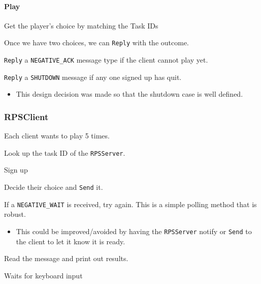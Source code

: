 \documentclass[letterpaper]{article}
\begin{document}
\paragraph{Play%
  \label{play}%
}
\setcounter{listcnt0}{0}
\begin{list}{.}
{
\setlength{\rightmargin}{\leftmargin}
}

\item Get the player's choice by matching the Task IDs

\item Once we have two choices, we can \texttt{Reply} with the outcome.

\item \texttt{Reply} a \texttt{NEGATIVE\_ACK} message type if the client cannot play yet.

\item \texttt{Reply} a \texttt{SHUTDOWN} message if any one signed up has quit.
%
\begin{itemize}

\item This design decision was made so that the shutdown case is well defined.

\end{itemize}
\end{list}


\subsubsection{RPSClient%
  \label{rpsclient}%
}

Each client wants to play 5 times.
\setcounter{listcnt0}{0}
\begin{list}{.}
{
\setlength{\rightmargin}{\leftmargin}
}

\item Look up the task ID of the \texttt{RPSServer}.

\item Sign up

\item Decide their choice and \texttt{Send} it.

\item If a \texttt{NEGATIVE\_WAIT} is received, try again. This is a simple polling method that is robust.
%
\begin{itemize}

\item This could be improved/avoided by having the \texttt{RPSServer} notify or \texttt{Send} to the client to let it know it is ready.

\end{itemize}

\item Read the message and print out results.

\item Waits for keyboard input
\end{list}
\end{document}
